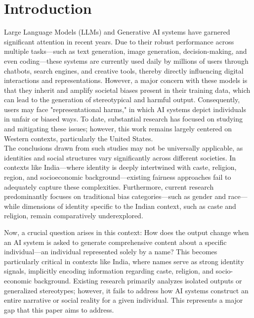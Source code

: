 \documentclass[sigconf,screen]{acmart}
\begin{document}

\maketitle

\section{Introduction}
Large Language Models (LLMs) and Generative AI systems have garnered significant attention in recent years. Due to their robust performance across multiple tasks—such as text generation, image generation, decision-making, and even coding—these systems are currently used daily by millions of users through chatbots, search engines, and creative tools, thereby directly influencing digital interactions and representations. However, a major concern with these models is that they inherit and amplify societal biases present in their training data, which can lead to the generation of stereotypical and harmful output. Consequently, users may face "representational harms," in which AI systems depict individuals in unfair or biased ways. To date, substantial research has focused on studying and mitigating these issues; however, this work remains largely centered on Western contexts, particularly the United States.\\
The conclusions drawn from such studies may not be universally applicable, as identities and social structures vary significantly across different societies. In contexts like India—where identity is deeply intertwined with caste, religion, region, and socioeconomic background—existing fairness approaches fail to adequately capture these complexities. Furthermore, current research predominantly focuses on traditional bias categories—such as gender and race—while dimensions of identity specific to the Indian context, such as caste and religion, remain comparatively underexplored.

Now, a crucial question arises in this context: How does the output change when an AI system is asked to generate comprehensive content about a specific individual—an individual represented solely by a name? This becomes particularly critical in contexts like India,  where names serve as strong identity signals, implicitly encoding information regarding caste, religion, and socio-economic background. Existing research primarily analyzes isolated outputs or generalized stereotypes; however, it fails to address how AI systems construct an entire narrative or social reality for a given individual. This represents a major gap that this paper aims to address.
\end{document}
